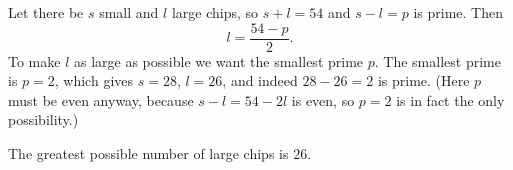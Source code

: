 Let there be $s$ small and $l$ large chips, so $s+l=54$ and $s-l=p$ is prime. Then
\[
l=\dfrac{54-p}{2}.
\]
To make $l$ as large as possible we want the smallest prime $p$. The smallest prime is $p=2$, which gives $s=28$, $l=26$, and indeed $28-26=2$ is prime. (Here $p$ must be even anyway, because $s-l=54-2l$ is even, so $p=2$ is in fact the only possibility.)

The greatest possible number of large chips is $\boxed{26}$.
